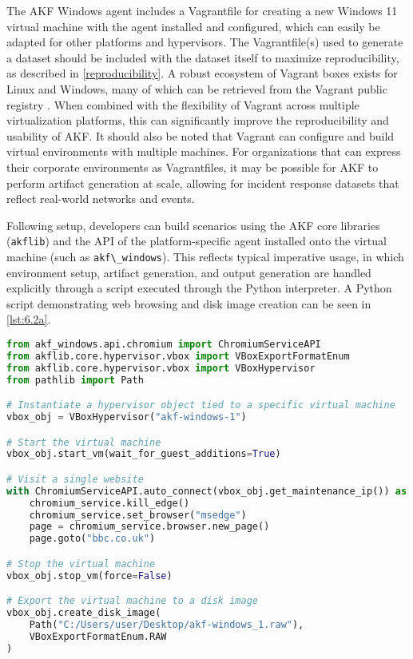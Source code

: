 The AKF Windows agent includes a Vagrantfile for creating a new Windows
11 virtual machine with the agent installed and configured, which can
easily be adapted for other platforms and hypervisors. The
Vagrantfile(s) used to generate a dataset should be included with the
dataset itself to maximize reproducibility, as described in
\autoref{reproducibility}. A robust ecosystem of Vagrant boxes exists
for Linux and Windows, many of which can be retrieved from the Vagrant
public registry \citep{hashicorpHashiCorpCloudPlatform}. When
combined with the flexibility of Vagrant across multiple virtualization
platforms, this can significantly improve the reproducibility and
usability of AKF. It should also be noted that Vagrant can configure and
build virtual environments with multiple machines. For organizations
that can express their corporate environments as Vagrantfiles, it may be
possible for AKF to perform artifact generation at scale, allowing for
incident response datasets that reflect real-world networks and events.

Following setup, developers can build scenarios using the AKF core
libraries (\passthrough{\lstinline!akflib!}) and the API of the
platform-specific agent installed onto the virtual machine (such as
\passthrough{\lstinline!akf\_windows!}). This reflects typical
imperative usage, in which environment setup, artifact generation, and
output generation are handled explicitly through a script executed
through the Python interpreter. A Python script demonstrating web
browsing and disk image creation can be seen in \autoref{lst:6.2a}.

\begin{lstlisting}[label={lst:6.2a}, caption={Example of an imperative AKF scenario.}, language=Python]
from akf_windows.api.chromium import ChromiumServiceAPI
from akflib.core.hypervisor.vbox import VBoxExportFormatEnum
from akflib.core.hypervisor.vbox import VBoxHypervisor
from pathlib import Path

# Instantiate a hypervisor object tied to a specific virtual machine
vbox_obj = VBoxHypervisor("akf-windows-1")

# Start the virtual machine
vbox_obj.start_vm(wait_for_guest_additions=True)

# Visit a single website
with ChromiumServiceAPI.auto_connect(vbox_obj.get_maintenance_ip()) as chromium_service:
    chromium_service.kill_edge()
    chromium_service.set_browser("msedge")
    page = chromium_service.browser.new_page()
    page.goto("bbc.co.uk")

# Stop the virtual machine
vbox_obj.stop_vm(force=False)

# Export the virtual machine to a disk image
vbox_obj.create_disk_image(
    Path("C:/Users/user/Desktop/akf-windows_1.raw"),
    VBoxExportFormatEnum.RAW
)
\end{lstlisting}

